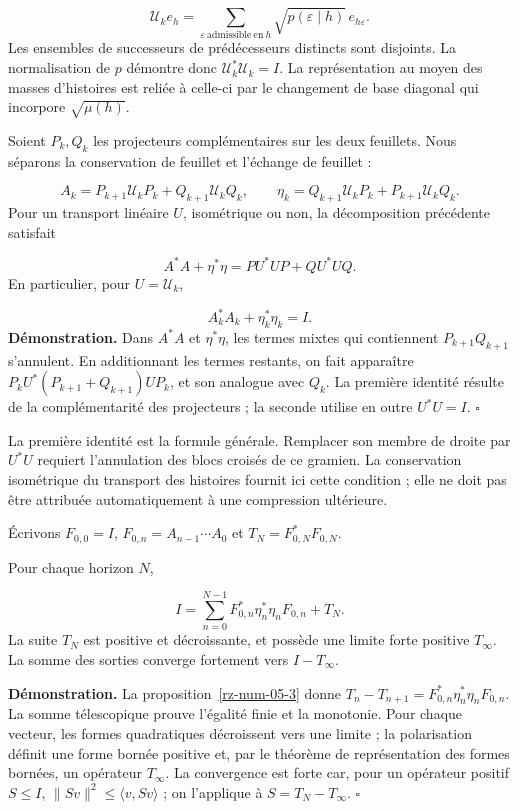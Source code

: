 \[
\mathcal U_ke_h=
\sum_{\varepsilon\ \mathrm{admissible\ en}\ h}
\sqrt{p(\varepsilon\mid h)}\,e_{h\varepsilon}.
\]
Les ensembles de successeurs de prédécesseurs distincts sont disjoints. La normalisation de \(p\) démontre donc \(\mathcal U_k^*\mathcal U_k=I\). La représentation au moyen des masses d’histoires est reliée à celle-ci par le changement de base diagonal qui incorpore \(\sqrt{\mu(h)}\).

Soient \(P_k,Q_k\) les projecteurs complémentaires sur les deux feuillets. Nous séparons la conservation de feuillet et l'échange de feuillet :

\[
A_k=P_{k+1}\mathcal U_kP_k+Q_{k+1}\mathcal U_kQ_k,
\qquad
\eta_k=Q_{k+1}\mathcal U_kP_k+P_{k+1}\mathcal U_kQ_k.
\]
Pour un transport linéaire \(U\), isométrique ou non, la décomposition précédente satisfait

\[
A^*A+\eta^*\eta=PU^*UP+QU^*UQ.
\]
En particulier, pour \(U=\mathcal U_k\),

\[
A_k^*A_k+\eta_k^*\eta_k=I.
\]
\textbf{Démonstration.} Dans \(A^*A\) et \(\eta^*\eta\), les termes mixtes qui contiennent \(P_{k+1}Q_{k+1}\) s’annulent. En additionnant les termes restants, on fait apparaître \(P_kU^*(P_{k+1}+Q_{k+1})UP_k\), et son analogue avec \(Q_k\). La première identité résulte de la complémentarité des projecteurs ; la seconde utilise en outre \(U^*U=I\). \hfill\(\square\)

La première identité est la formule générale. Remplacer son membre de droite par \(U^*U\) requiert l'annulation des blocs croisés de ce gramien. La conservation isométrique du transport des histoires fournit ici cette condition ; elle ne doit pas être attribuée automatiquement à une compression ultérieure.

Écrivons \(F_{0,0}=I\), \(F_{0,n}=A_{n-1}\cdots A_0\) et \(T_N=F_{0,N}^*F_{0,N}\).

Pour chaque horizon \(N\),

\[
I=\sum_{n=0}^{N-1}
F_{0,n}^*\eta_n^*\eta_nF_{0,n}+T_N.
\]
La suite \(T_N\) est positive et décroissante, et possède une limite forte positive \(T_\infty\). La somme des sorties converge fortement vers \(I-T_\infty\).

\textbf{Démonstration.} La proposition~\ref{rz-num-05-3} donne \(T_n-T_{n+1}=F_{0,n}^*\eta_n^*\eta_nF_{0,n}\). La somme télescopique prouve l’égalité finie et la monotonie. Pour chaque vecteur, les formes quadratiques décroissent vers une limite ; la polarisation définit une forme bornée positive et, par le théorème de représentation des formes bornées, un opérateur \(T_\infty\). La convergence est forte car, pour un opérateur positif \(S\leq I\), \(\|Sv\|^2\leq\langle v,Sv\rangle\) ; on l’applique à \(S=T_N-T_\infty\). \hfill\(\square\)

